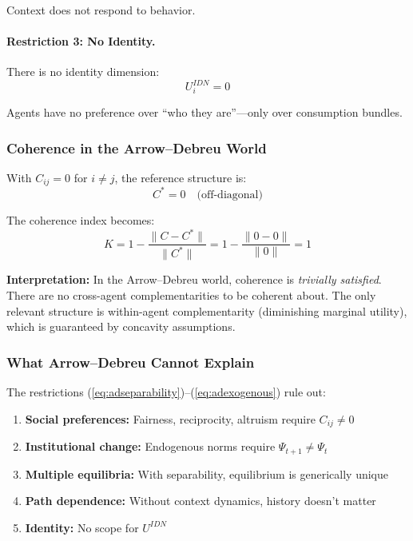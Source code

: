 \documentclass[12pt,a4paper]{article}
\begin{document}
Context does not respond to behavior.

\paragraph{Restriction 3: No Identity.}
There is no identity dimension:
\begin{equation}
  U_i^{IDN} = 0
\end{equation}

Agents have no preference over ``who they are''---only over consumption bundles.

\subsubsection{Coherence in the Arrow--Debreu World}

With $C_{ij} = 0$ for $i \neq j$, the reference structure is:
\begin{equation}
  C^* = 0 \quad \text{(off-diagonal)}
\end{equation}

The coherence index becomes:
\begin{equation}
  K = 1 - \frac{\|C - C^*\|}{\|C^*\|} = 1 - \frac{\|0 - 0\|}{\|0\|} = 1
\end{equation}

\textbf{Interpretation:} In the Arrow--Debreu world, coherence is \emph{trivially satisfied}.
There are no cross-agent complementarities to be coherent about.
The only relevant structure is within-agent complementarity (diminishing marginal utility),
which is guaranteed by concavity assumptions.

\subsubsection{What Arrow--Debreu Cannot Explain}

The restrictions (\ref{eq:adseparability})--(\ref{eq:adexogenous}) rule out:
\begin{enumerate}
  \item \textbf{Social preferences:} Fairness, reciprocity, altruism require $C_{ij} \neq 0$
  \item \textbf{Institutional change:} Endogenous norms require $\Psi_{t+1} \neq \Psi_t$
  \item \textbf{Multiple equilibria:} With separability, equilibrium is generically unique
  \item \textbf{Path dependence:} Without context dynamics, history doesn't matter
  \item \textbf{Identity:} No scope for $U^{IDN}$
\end{enumerate}
\end{document}
